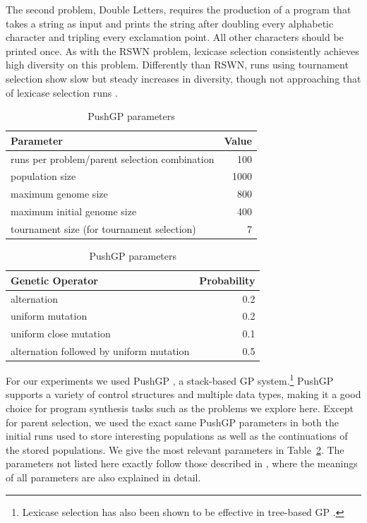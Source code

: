 \documentclass{sig-alternate-05-2015}
\begin{document}
The second problem, Double Letters, requires the production of a program that takes a string as input and prints the string after doubling every alphabetic character and tripling every exclamation point. All other characters should be printed once. As with the RSWN problem, lexicase selection consistently achieves high diversity on this problem. Differently than RSWN, runs using tournament selection show slow but steady increases in diversity, though not approaching that of lexicase selection runs \cite{Helmuth:2015:GPTP}.

\begin{table}[t]
\centering
\caption{PushGP parameters}
\label{table:parameters}
\begin{tabular}{l r}
\toprule
\textbf{Parameter} & \textbf{Value} \tabularnewline
\midrule
runs per problem/parent selection combination & 100 \tabularnewline
population size & 1000 \tabularnewline
maximum genome size & 800 \tabularnewline
maximum initial genome size & 400 \tabularnewline
tournament size (for tournament selection) & 7 \tabularnewline
\midrule
\end{tabular}
\begin{tabular}{l r}
\textbf{Genetic Operator} & \textbf{Probability} \tabularnewline
\midrule
alternation & 0.2 \tabularnewline
uniform mutation & 0.2 \tabularnewline
uniform close mutation & 0.1 \tabularnewline
alternation followed by uniform mutation & 0.5 \tabularnewline
\bottomrule
\end{tabular}
\end{table}

For our experiments we used PushGP \cite{spector:2002:GPEM, 1068292}, a stack-based GP system.\footnote{Lexicase selection has also been shown to be effective in tree-based GP \cite{Helmuth:2015:ieeeTEC, Krawiec:2015:GECCO:smgpWorkshop}.} PushGP supports a variety of control structures and multiple data types, making it a good choice for program synthesis tasks such as the problems we explore here.
Except for parent selection, we used the exact same PushGP parameters in both the initial runs used to store interesting populations as well as the continuations of the stored populations. We give the most relevant parameters in Table~\ref{table:parameters}. The parameters not listed here exactly follow those described in \cite{Helmuth:2015:dissertation}, where the meanings of all parameters are also explained in detail.
\end{document}
